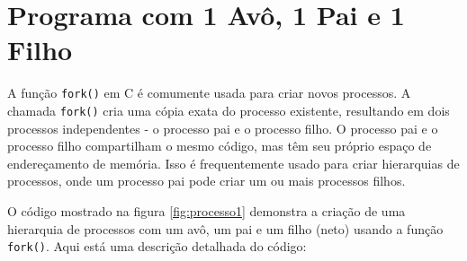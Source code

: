 \documentclass[
	12pt,				%
	openright,			%
	oneside,			%
	a4paper,			%
	chapter=TITLE,		%
	english,			%
	french,				%
	spanish,			%
	brazil				%
	]{abntex2}
\theoremstyle{definition}
\begin{document}

\section{Programa com 1 Avô, 1 Pai e 1 Filho}


A função \texttt{fork()} em C é comumente usada para criar novos processos. 
A chamada \texttt{fork()} cria uma cópia exata do processo existente, 
resultando em dois processos independentes - o processo pai e o processo filho. 
O processo pai e o processo filho compartilham o mesmo código, mas têm 
seu próprio espaço de endereçamento de memória. Isso é frequentemente usado 
para criar hierarquias de processos, onde um processo pai pode criar um ou 
mais processos filhos.

O código mostrado na figura \ref{fig:processo1} demonstra a criação de uma hierarquia de processos 
com um avô, um pai e um filho (neto) usando a função \texttt{fork()}. 
Aqui está uma descrição detalhada do código:
\end{document}
